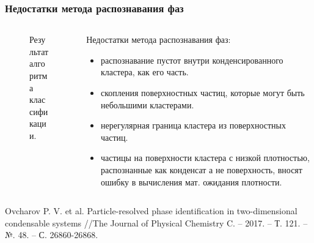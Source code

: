 \documentclass[pdf,hyperref={unicode}]{beamer}
\begin{document}
\begin{frame}
\transdissolve[duration=0.2]
\frametitle{Недостатки метода распознавания фаз}

\begin{columns}

\begin{column}{0.47\linewidth}
{
\begin{figure}[h]
\caption{\tiny Результат алгоритма классификации.}
\end{figure}
}
\end{column}


\begin{column}{0.47\linewidth}
{\tiny{
Недостатки метода распознавания фаз:
\begin{itemize}
\item распознавание пустот внутри конденсированного кластера, как его часть.
\item скопления поверхностных частиц, которые могут быть небольшими кластерами.
\item нерегулярная граница кластера из поверхностных частиц.
\item частицы на поверхности кластера с низкой плотностью, распознанные как конденсат а не поверхность, вносят ошибку в вычисления мат. ожидания плотности.
\end{itemize}
}}
\end{column}

\end{columns}

\vspace{5mm}
\tiny{
Ovcharov P. V. et al. Particle-resolved phase identification in two-dimensional condensable systems //The Journal of Physical Chemistry C. – 2017. – Т. 121. – №. 48. – С. 26860-26868.
}

\end{frame}
\end{document}
